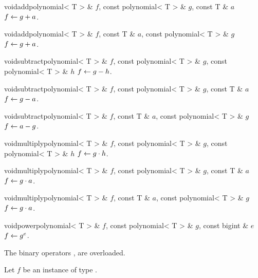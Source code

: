 \begin{fcode}{void}{add}{polynomial< T > & $f$, const polynomial< T > & $g$, const T & $a$}
  $f \leftarrow g + a$.
\end{fcode}

\begin{fcode}{void}{add}{polynomial< T > & $f$, const T & $a$, const polynomial< T > & $g$}
  $f \leftarrow g + a$.
\end{fcode}

\begin{fcode}{void}{subtract}{polynomial< T > & $f$, const polynomial< T > & $g$, const polynomial< T > & $h$}
  $f \leftarrow g - h$.
\end{fcode}

\begin{fcode}{void}{subtract}{polynomial< T > & $f$, const polynomial< T > & $g$, const T & $a$}
  $f \leftarrow g - a$.
\end{fcode}

\begin{fcode}{void}{subtract}{polynomial< T > & $f$, const T & $a$, const polynomial< T > & $g$}
  $f \leftarrow a - g$.
\end{fcode}

\begin{fcode}{void}{multiply}{polynomial< T > & $f$, const polynomial< T > & $g$, const polynomial< T > & $h$}
  $f \leftarrow g \cdot h$.
\end{fcode}

\begin{fcode}{void}{multiply}{polynomial< T > & $f$, const polynomial< T > & $g$, const T & $a$}
  $f \leftarrow g \cdot a$.
\end{fcode}

\begin{fcode}{void}{multiply}{polynomial< T > & $f$, const T & $a$, const polynomial< T > & $g$}
  $f \leftarrow g \cdot a$.
\end{fcode}

\begin{fcode}{void}{power}{polynomial< T > & $f$, const polynomial< T > & $g$, const bigint & $e$}
  $f \leftarrow g^e$.
\end{fcode}



\COMP

The binary operators \code{==}, \code{!=} are overloaded.

Let $f$ be an instance of type .

